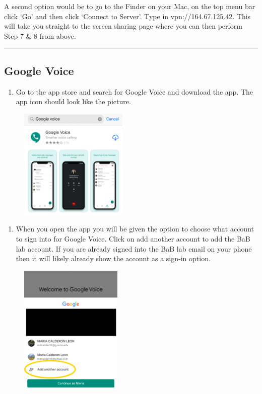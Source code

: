 \documentclass[]{book}
\providecommand{\tightlist}{%
  \setlength{\itemsep}{0pt}\setlength{\parskip}{0pt}}
\begin{document}
A second option would be to go to the Finder on your Mac, on the top menu bar click `Go' and then click `Connect to Server'. Type in vpn://164.67.125.42. This will take you straight to the screen sharing page where you can then perform Step 7 \& 8 from above.

\begin{center}\rule{0.5\linewidth}{0.5pt}\end{center}

\hypertarget{google-voice}{%
\subsection{Google Voice}\label{google-voice}}

\begin{enumerate}
\def\labelenumi{\arabic{enumi})}
\tightlist
\item
  Go to the app store and search for Google Voice and download the app. The app icon should look like the picture.
\end{enumerate}

\begin{figure}
\centering
\includegraphics{images/research_protocols/google_voice/pic1.png}
\caption{}
\end{figure}

\begin{enumerate}
\def\labelenumi{\arabic{enumi})}
\setcounter{enumi}{1}
\tightlist
\item
  When you open the app you will be given the option to choose what account to sign into for Google Voice. Click on add another account to add the BaB lab account. If you are already signed into the BaB lab email on your phone then it will likely already show the account as a sign-in option.
\end{enumerate}

\begin{figure}
\centering
\includegraphics{images/research_protocols/google_voice/pic2.png}
\caption{}
\end{figure}
\end{document}
